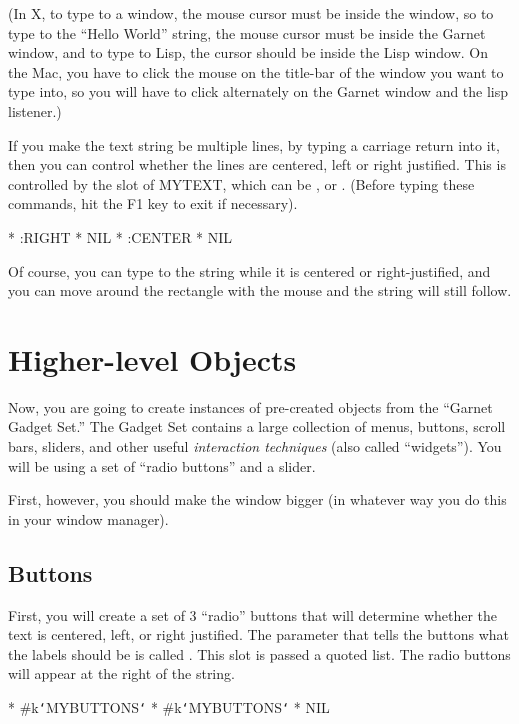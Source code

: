 (In X, to type to a window, the mouse cursor must be inside the window, so to
type to the ``Hello World'' string, the mouse cursor must be inside the Garnet
window, and to type to Lisp, the cursor should be inside the Lisp
window.  On the Mac, you have to click the mouse on the title-bar of
the window you want to type into, so you will have to click
alternately on the Garnet window and the lisp listener.)


If you make the text string be multiple lines, by typing a carriage
return into it,
then you can control whether the lines are centered, left or right
justified.  This is controlled by the  slot of
MYTEXT, which can be , or .
(Before typing these commands, hit the F1 key to exit  
if necessary).
\begin{programexample}
* 
:RIGHT
* 
NIL
* 
:CENTER
* 
NIL
\end{programexample}

Of course, you can type to the string while it is centered or
right-justified, and you can move around the rectangle with the mouse and
the string will still follow.

\section{Higher-level Objects}

Now, you are going to create instances of pre-created objects from the
``Garnet Gadget Set.''  The Gadget Set contains a large collection of menus,
buttons, scroll bars, sliders, and other useful {\it interaction techniques}
(also called ``widgets'').  You will be using a set of ``radio buttons''
and a slider.

First, however, you should make the window bigger (in whatever way you
do this in
your window manager).

\subsection{Buttons}

First, you will create a set of 3 ``radio'' buttons that will determine
whether the text
is centered, left, or right justified.  The parameter that tells the
buttons what the labels should be is called .  This slot is
passed a quoted list.  The radio buttons will appear at the right of
the string.
\begin{programexample}
* 
\#k{\tt\char`\<}MYBUTTONS{\tt\char`\>}
* 
\#k{\tt\char`\<}MYBUTTONS{\tt\char`\>}
* 
NIL
\end{programexample}

